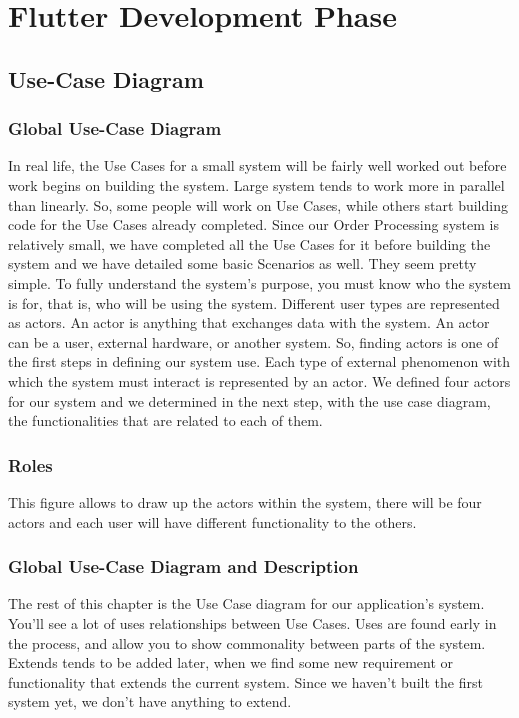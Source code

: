 \section{Flutter Development Phase}
\subsection{Use-Case Diagram}
\subsubsection{Global Use-Case Diagram}
In real life, the Use Cases for a small system will be fairly well worked out before work begins
on building the system. Large system tends to work more in parallel than linearly. So, some
people will work on Use Cases, while others start building code for the Use Cases already
completed. Since our Order Processing system is relatively small, we have completed all the
Use Cases for it before building the system and we have detailed some basic Scenarios as
well.
They seem pretty simple.
To fully understand the system's purpose, you must know who the system is for, that is, who
will be using the system. Different user types are represented as actors.
An actor is anything that exchanges data with the system. An actor can be a user, external
hardware, or another system. So, finding actors is one of the first steps in defining our system
use. Each type of external phenomenon with which the system must interact is represented by
an actor. We defined four actors for our system and we determined in the next step, with the
use case diagram, the functionalities that are related to each of them.
\subsubsection{Roles}
This figure allows to draw up the actors within the system, there will be four actors and each
user will have different functionality to the others.

\subsubsection{Global Use-Case Diagram and  Description}
The rest of this chapter is the Use Case diagram for our application’s system.
You’ll see a lot of uses relationships between Use Cases. Uses are found early in the process,
and allow you to show commonality between parts of the system. Extends tends to be added
later, when we find some new requirement or functionality that extends the current system.
Since we haven’t built the first system yet, we don’t have anything to extend.

